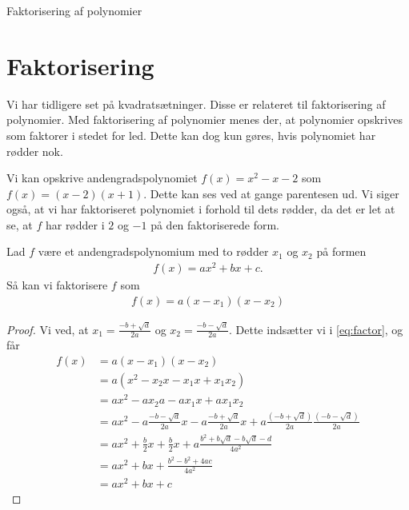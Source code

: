






\begin{center}
\Huge
Faktorisering af polynomier
\end{center}
\section*{Faktorisering}

Vi har tidligere set på kvadratsætninger. Disse er relateret til faktorisering af polynomier. Med faktorisering af polynomier menes der, at polynomier opskrives som faktorer i stedet for led. Dette kan dog kun gøres, hvis polynomiet har rødder nok. 
\begin{exa}
Vi kan opskrive andengradspolynomiet $f(x) = x^2 -x -2$ som $f(x) = (x-2)(x+1)$. Dette kan ses ved at gange parentesen ud. Vi siger også, at vi har faktoriseret polynomiet i forhold til dets rødder, da det er let at se, at $f$ har rødder i $2$ og $-1$ på den faktoriserede form.
\end{exa}
\begin{setn}
Lad $f$ være et andengradspolynomium med to rødder $x_1$ og $x_2$ på formen
\begin{align*}
f(x) = ax^2+bx+c.
\end{align*}
Så kan vi faktorisere $f$ som
\begin{align}\label{eq:factor}
f(x) = a(x-x_1)(x-x_2)
\end{align}
\end{setn}
\begin{proof}
Vi ved, at $x_1 = \frac{-b+\sqrt{d}}{2a}$ og $x_2 = \frac{-b-\sqrt{d}}{2a}$. Dette indsætter vi i \eqref{eq:factor}, og får
\begin{align*}
f(x) &= a(x-x_1)(x-x_2)\\
	 &= a(x^2-x_2x-x_1x+x_1x_2)\\
	 &=ax^2-ax_2a-ax_1x+ax_1x_2\\
	 &=ax^2 -a\frac{-b-\sqrt{d}}{2a}x - a\frac{-b+\sqrt{d}}{2a}x + a\frac{(-b+\sqrt{d})}{2a}\frac{(-b-\sqrt{d})}{2a}\\
	 &=ax^2 + \frac{b}{2}x + \frac{b}{2}x + a\frac{b^2+b\sqrt{d}-b\sqrt{d}-d}{4a^2} \\
	 &= ax^2 + bx + \frac{b^2-b^2+4ac}{4a^2}\\
	 &= ax^2 + bx+c
\end{align*}
\end{proof}



